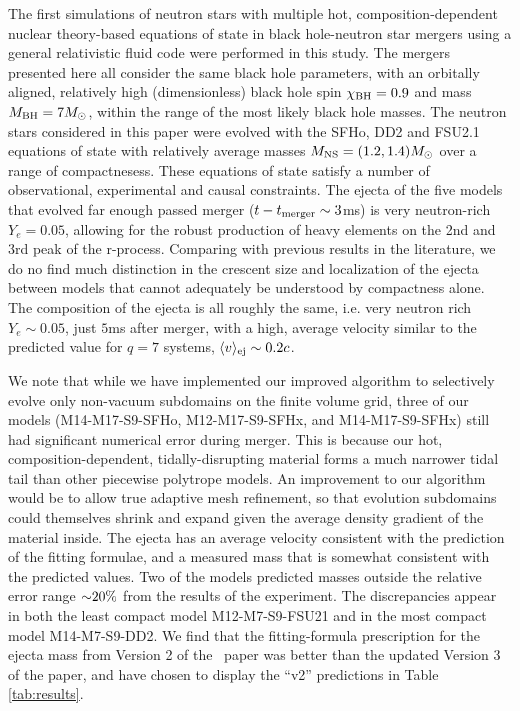 The first simulations of neutron stars with multiple hot, composition-dependent nuclear theory-based equations of state in black hole-neutron star mergers using a general relativistic fluid code were performed in this study.  
The mergers presented here all consider the same black hole parameters, with an orbitally aligned, relatively high (dimensionless) black hole spin $\chi_{\rm BH} = 0.9$ and  mass $M_{\rm BH} = 7 M_\odot$, within the range of the most likely black hole masses.  
The neutron stars considered in this paper were evolved with the SFHo, DD2 and FSU2.1 equations of state with relatively average masses $M_{\rm NS} = (1.2,1.4) M_\odot$ over a range of compactnesess.  
These equations of state satisfy a number of observational, experimental and causal constraints.  
The ejecta of the five models that evolved far enough passed merger ($t - t_{\rm merger} \sim 3$ms) is very neutron-rich $Y_e = 0.05$, allowing for the robust production of heavy elements on the 2nd and 3rd peak of the r-process.
Comparing with previous results in the literature, we do no find much distinction in the crescent size and localization of the ejecta between models that cannot adequately be understood by compactness alone.  The composition of the ejecta is all roughly the same, i.e. very neutron rich $Y_e \sim 0.05$, just $5$ms after merger, with a high, average velocity similar to the predicted value for $q=7$ systems, $\langle v \rangle_{\rm ej} \sim 0.2 c$.

We note that while we have implemented our improved algorithm to selectively evolve only non-vacuum subdomains on the finite volume grid, three of our models (M14-M17-S9-SFHo, M12-M17-S9-SFHx, and M14-M17-S9-SFHx) still had significant numerical error during merger. 
This is because our hot, composition-dependent, tidally-disrupting material forms a much narrower tidal tail than other piecewise polytrope models.
An improvement to our algorithm would be to allow true adaptive mesh refinement, so that evolution subdomains could themselves shrink and expand given the average density gradient of the material inside.
The ejecta has an average velocity consistent with the prediction of the fitting formulae, and a measured mass that is somewhat consistent with the predicted values.
Two of the models predicted masses outside the relative error range $\mathord{\sim}20\%$ from the results of the experiment.
The discrepancies appear in both the least compact model M12-M7-S9-FSU21 and in the most compact model M14-M7-S9-DD2.
We find that the fitting-formula prescription for the ejecta mass from Version 2 of the~\cite{Kyutoku:2015} paper was better than the updated Version 3 of the paper, and have chosen to display the ``v2'' predictions in Table \ref{tab:results}.

